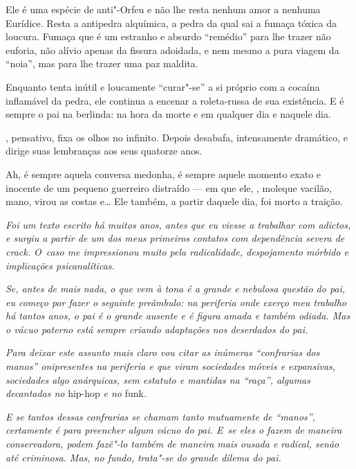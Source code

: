 Ele é uma espécie de anti"-Orfeu e não lhe resta nenhum amor a nenhuma
Eurídice. Resta a antipedra alquímica, a pedra da qual sai a fumaça
tóxica da loucura. Fumaça que é um estranho e absurdo ``remédio'' para
lhe trazer não euforia, não alívio apenas da fissura adoidada, e nem
mesmo a pura viagem da ``noia'', mas para lhe trazer uma paz maldita.

Enquanto  tenta inútil e loucamente ``curar"-se'' a si próprio com a
cocaína inflamável da pedra, ele continua a encenar a roleta-russa de
sua existência. E é sempre o pai na berlinda: na hora da morte e em
qualquer dia e naquele dia.

, pensativo, fixa os olhos no infinito. Depois desabafa, intensamente
dramático, e dirige suas lembranças aos seus quatorze anos.

Ah, é sempre aquela conversa medonha, é sempre aquele momento exato e
inocente de um pequeno guerreiro distraído --- em que ele, , moleque
vacilão, mano, virou as costas e… Ele também, a partir daquele
dia, foi morto a traição.

\begin{center}\asterisc{}\end{center}

\emph{Foi um texto escrito há muitos anos, antes que eu viesse a
trabalhar com adictos, e surgiu a partir de um dos meus primeiros
contatos com dependência severa de crack. O~caso me impressionou muito
pela radicalidade, despojamento mórbido e implicações psicanalíticas.}

\emph{Se, antes de mais nada, o que vem à tona é a grande e nebulosa
questão do pai, eu começo por fazer o seguinte preâmbulo: na periferia
onde exerço meu trabalho há tantos anos, o pai é o grande ausente e é
figura amada e também odiada. Mas o vácuo paterno está sempre criando
adaptações nos deserdados do pai.}

\emph{Para deixar este assunto mais claro vou citar as inúmeras
``confrarias dos manos'' onipresentes na periferia e que viram
sociedades móveis e expansivas, sociedades algo anárquicas, sem estatuto
e mantidas na ``raça'', algumas decantadas no} hip-hop \emph{e no} funk.

\emph{E se tantos dessas confrarias se chamam tanto mutuamente de
``manos'', certamente é para preencher algum vácuo do pai. E~se eles o
fazem de maneira conservadora, podem fazê"-lo também de maneira mais
ousada e radical, senão até criminosa. Mas, no fundo, trata"-se do grande
dilema do pai.}

